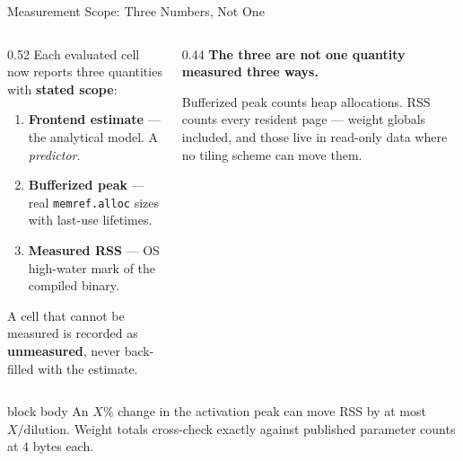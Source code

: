 \documentclass[10pt,aspectratio=169]{beamer}
\begin{document}
\begin{frame}{Measurement Scope: Three Numbers, Not One}
\begin{columns}[T,totalwidth=0.99\textwidth]
\begin{column}{0.52\textwidth}
Each evaluated cell now reports three quantities with \textbf{stated scope}:
\begin{enumerate}
\small
\item \textcolor{edgegray}{\textbf{Frontend estimate}} --- the analytical model. A \emph{predictor}.
\item \textcolor{edgeblue}{\textbf{Bufferized peak}} --- real \texttt{memref.alloc} sizes with last-use lifetimes.
\item \textcolor{edgegreen}{\textbf{Measured RSS}} --- OS high-water mark of the compiled binary.
\end{enumerate}

\vspace{0.2cm}
A cell that cannot be measured is recorded as \textbf{unmeasured}, never
back-filled with the estimate.
\end{column}

\begin{column}{0.44\textwidth}
\textbf{The three are not one quantity measured three ways.}

\vspace{0.15cm}
\small
Bufferized peak counts heap allocations. RSS counts every resident page ---
weight globals included, and those live in read-only data where no tiling
scheme can move them.

\vspace{0.15cm}
\centering
{}
\end{column}
\end{columns}

\vspace{0.3cm}
\begin{beamercolorbox}[sep=0.35em,center,rounded=true,shadow=true]{block body}
\small
An $X\%$ change in the activation peak can move RSS by at most $X/\text{dilution}$.
Weight totals cross-check exactly against published parameter counts at 4 bytes each.
\end{beamercolorbox}
\end{frame}
\end{document}

